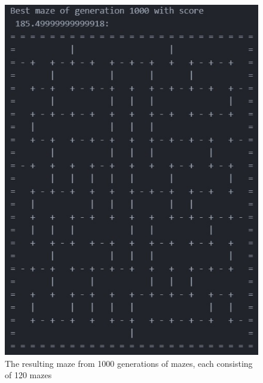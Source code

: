 \documentclass[10pt, a4paper, twoside]{amsart}
\newcommand{\1}{\mathbbm{1}}
\begin{document}
\begin{figure}
\centering
        \includegraphics[totalheight=8cm]{evolutional.jpg}
    \caption{The resulting maze from 1000 generations of mazes, each consisting of 120 mazes}
\end{figure}
\end{document}
